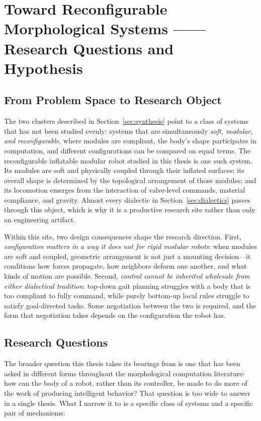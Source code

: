 \section{Toward Reconfigurable Morphological Systems —— Research Questions and Hypothesis}
\label{sec:rqs}

\subsection{From Problem Space to Research Object}

The two clusters described in Section~\ref{sec:synthesis} point to a class of systems that has not been studied evenly: systems that are simultaneously \textit{soft, modular, and reconfigurable}, where modules are compliant, the body's shape participates in computation, and different configurations can be compared on equal terms. The reconfigurable inflatable modular robot studied in this thesis is one such system. Its modules are soft and physically coupled through their inflated surfaces; its overall shape is determined by the topological arrangement of those modules; and its locomotion emerges from the interaction of valve-level commands, material compliance, and gravity. Almost every dialectic in Section~\ref{sec:dialectics} passes through this object, which is why it is a productive research site rather than only an engineering artifact.

Within this site, two design consequences shape the research direction. First, \textit{configuration matters in a way it does not for rigid modular robots}: when modules are soft and coupled, geometric arrangement is not just a mounting decision---it conditions how forces propagate, how neighbors deform one another, and what kinds of motion are possible. Second, \textit{control cannot be inherited wholesale from either dialectical tradition}: top-down gait planning struggles with a body that is too compliant to fully command, while purely bottom-up local rules struggle to satisfy goal-directed tasks. Some negotiation between the two is required, and the form that negotiation takes depends on the configuration the robot has.

\subsection{Research Questions}

The broader question this thesis takes its bearings from is one that has been asked in different forms throughout the morphological computation literature: how can the body of a robot, rather than its controller, be made to do more of the work of producing intelligent behavior? That question is too wide to answer in a single thesis. What I narrow it to is a specific class of systems and a specific pair of mechanisms:

